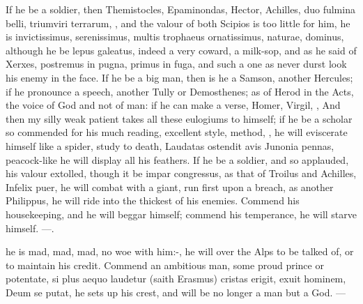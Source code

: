 {If he be a soldier, then Themistocles, Epaminondas, Hector, Achilles,
duo fulmina belli, triumviri terrarum, \etc{}, and the valour of both
Scipios is too little for him, he is invictissimus, serenissimus,
multis trophaeus ornatissimus, naturae, dominus, although he be lepus
galeatus, indeed a very coward, a milk-sop, and as he said of
Xerxes, postremus in pugna, primus in fuga, and such a one as never
durst look his enemy in the face. If he be a big man, then is he a
Samson, another Hercules; if he pronounce a speech, another Tully or
Demosthenes; as of Herod in the Acts, the voice of God and not of man:
if he can make a verse, Homer, Virgil, \etc{}, And then my silly weak
patient takes all these eulogiums to himself; if he be a scholar so
commended for his much reading, excellent style, method, \etc{}, he will
eviscerate himself like a spider, study to death, Laudatas ostendit
avis Junonia pennas, peacock-like he will display all his feathers. If
he be a soldier, and so applauded, his valour extolled, though it be
impar congressus, as that of Troilus and Achilles, Infelix puer, he
will combat with a giant, run first upon a breach, as another
Philippus, he will ride into the thickest of his enemies. Commend
his housekeeping, and he will beggar himself; commend his temperance,
he will starve himself.
---.

he is mad, mad, mad, no woe with him:-, he will
over the Alps to be talked of, or to maintain his credit. Commend
an ambitious man, some proud prince or potentate, si plus aequo
lau\-de\-tur (saith Erasmus) cristas erigit, exuit hominem, Deum se
putat, he sets up his crest, and will be no longer a man but a God.
---

}
